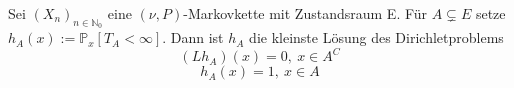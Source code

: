 \label{Dirichletsatz}
Sei $(X_{n})_{n \in \mathbb{N}_{0}}$ eine $(\nu,P)$-Markovkette mit Zustandsraum E. Für $A \subsetneq E$ setze $h_{A}(x) := \mathbb{P}_{x}[T_{A} < \infty] $. Dann ist $h_{A}$ die kleinste Lösung des Dirichletproblems
\begin{equation*}
(Lh_{A})(x) = 0, \: x \in A^{C}
\end{equation*}
\begin{equation*}
h_{A}(x) = 1, \: x \in A
\end{equation*}